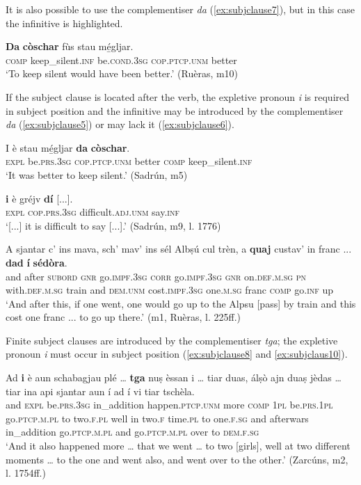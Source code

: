 It is also possible to use the complementiser \textit{da} (\ref{ex:subjclause7}), but in this case the infinitive is highlighted.

\ea
\label{ex:subjclause7}
\gll \textbf{Da} \textbf{còschar} fùs stau mé̱gljar.\\
\textsc{comp} keep\_silent.\textsc{inf} be.\textsc{cond.3sg} \textsc{cop.ptcp.unm} better \\
\glt `To keep silent would have been better.' (Ruèras, m10)
\z

If the subject clause is located after the verb, the expletive pronoun \textit{i} is required in subject position and the infinitive may be introduced by the complementiser \textit{da} (\ref{ex:subjclause5}) or may lack it (\ref{ex:subjclause6}).

\ea
\label{ex:subjclause5}
\gll I è stau mé̱gljar \textbf{da} \textbf{còschar}.\\
\textsc{expl} be.\textsc{prs.3sg} \textsc{cop.ptcp.unm} better \textsc{comp} keep\_silent.\textsc{inf}\\
\glt `It was better to keep silent.' (Sadrún, m5)
\z

\ea
\label{ex:subjclause6}
\gll [...] \textbf{i} è gréjv \longrule {} \textbf{dí} [...].\\
 {} \textsc{expl} \textsc{cop.prs.3sg} difficult.\textsc{adj.unm} {} say.\textsc{inf}\\
\glt `[...] it is difficult to say [...].' (Sadrún, m9, l. 1776)
\z

\ea
\label{ex:subjclause9}
\gll    A sjantar c’ ins mava, sch’ mav’ ins sél Albṣú cul trèn, a \textbf{quaj} custav’ in franc ... \textbf{dad} \textbf{í} \textbf{sédòra}.\\
and after \textsc{subord} \textsc{gnr}  go.\textsc{impf.3sg} \textsc{corr} go.\textsc{impf.3sg} \textsc{gnr} on.\textsc{def.m.sg} \textsc{pn} with.\textsc{def.m.sg} train and \textsc{dem.unm} cost.\textsc{impf.3sg} one.\textsc{m.sg}  franc {} \textsc{comp} go.\textsc{inf} up\\
\glt `And after this, if one went, one would go up to the Alpsu [pass] by train and this cost one franc ... to go up there.' (m1, Ruèras, l. 225ff.)
\z




Finite subject clauses are introduced by the complementiser \textit{tga}; the expletive pronoun \textit{i} must occur in subject position (\ref{ex:subjclause8} and \ref{ex:subjclaus10}).

\ea
\label{ex:subjclause8}
\gll    Ad \textbf{i} è aun schabagjau plé … \textbf{tga} nuṣ èssan i … tiar duas, álṣò ajn duaṣ jèdas … tiar ina api sjantar aun í ad í vi tiar tschèla.\\
and \textsc{expl} be.\textsc{prs.3sg} in\_addition happen.\textsc{ptcp.unm} more {} \textsc{comp}  \textsc{1pl} be.\textsc{prs.1pl} go.\textsc{ptcp.m.pl} {} to two.\textsc{f.pl} well in two.\textsc{f} time.\textsc{pl} {} to one.\textsc{f.sg} and afterwars in\_addition go.\textsc{ptcp.m.pl} and  go.\textsc{ptcp.m.pl} over to \textsc{dem.f.sg}\\
\glt `And it also happened more … that we went … to two [girls], well at two different moments … to the one and went also, and went over to the other.' (Zarcúns, m2, l. 1754ff.)
\z

